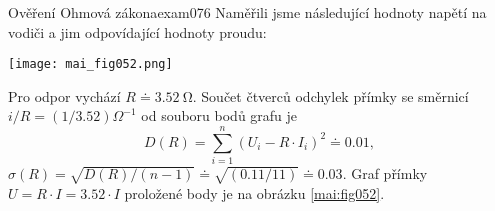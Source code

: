 \begin{mathexam}{Ověření Ohmová zákona}{exam076}
  Naměřili jsme následující hodnoty napětí na vodiči a jim odpovídající hodnoty proudu:
  
  \begin{center}
  \end{center}

  {\centering
  \captionsetup{type=figure}
  \texttt{[image: mai\_fig052.png]}
  \par}
  Pro odpor vychází \(R\doteq\SI{3.52}{\ohm}\). Součet čtverců odchylek přímky se směrnicí \(i/R
  = (1/\num{3.52})\Omega^{-1}\) od souboru bodů grafu je
  \begin{equation*}
    D(R) = \sum_{i=1}^{n}(U_i - R\cdot I_i)^2 \doteq\num{0.01},
  \end{equation*}
  \(\sigma(R) = \sqrt{D(R)/(n-1)}\doteq\sqrt{(\num{0.11}/11)}\doteq\num{0.03}\).  Graf přímky \(U
  = R\cdot I = \num{3.52}\cdot I\) proložené body je na obrázku \ref{mai:fig052}.
\end{mathexam}